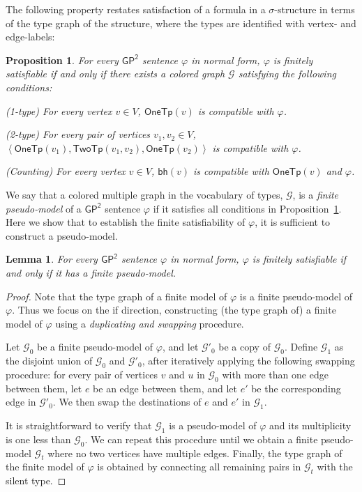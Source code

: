 \documentclass[10pt,a4paper]{article}
\newtheorem{lemma}[theorem]{Lemma}
\newtheorem{proposition}[theorem]{Proposition}
\theoremstyle{definition}
\theoremstyle{remark}
\newcommand{\cG}{\mathcal{G}}
\newcommand{\vocab}{\sigma}
\newcommand{\onetypeof}{\mathsf{OneTp}}
\newcommand{\twotypeof}{\mathsf{TwoTp}}
\newcommand{\GPtwo}   {\mathsf{GP^2}}
\newcommand{\tuple}[1]       {\left\langle #1 \right\rangle}
\newcommand{\bh}[1] {\mathsf{bh}\left( #1 \right)}
\begin{document}
The following property restates satisfaction of a formula in a $\vocab$-structure in terms of the type graph of the structure, where the types are identified with vertex- and edge-labels:
\begin{proposition}\label{prop:labeled_gptwo}
    For every $\GPtwo$ sentence $\varphi$ in normal form,
    $\varphi$ is finitely satisfiable if and only if
    there exists a colored graph $\cG$ satisfying the following conditions:
    \begin{compactitem}
        \item (1-type) For every vertex $v \in V$, $\onetypeof(v)$ is compatible with $\varphi$.
        \item (2-type) For every pair of vertices $v_1, v_2 \in V$,
        $\tuple{\onetypeof(v_1), \twotypeof(v_1, v_2), \onetypeof(v_2)}$ is compatible with $\varphi$.
        \item (Counting) For every vertex $v \in V$, $\bh{v}$ is compatible with $\onetypeof(v)$ and $\varphi$.
    \end{compactitem}
\end{proposition}

We say that a colored multiple graph in the vocabulary of types, $\cG$, is a \emph{finite pseudo-model} of a $\GPtwo$ sentence $\varphi$ if it satisfies all conditions in Proposition~\ref{prop:labeled_gptwo}.
Here we show that to establish the finite satisfiability of $\varphi$, it is sufficient to construct a pseudo-model.

\begin{lemma}\label{lem:pseudo}
    For every $\GPtwo$ sentence $\varphi$ in normal form,
    $\varphi$ is finitely satisfiable if and only if it has a finite pseudo-model.
\end{lemma}

\begin{proof}
    Note that the type graph of a finite model of $\varphi$ is a finite pseudo-model of $\varphi$. 
    Thus we focus on the if direction,  constructing (the type graph of) a finite model of $\varphi$ using a \emph{duplicating and swapping} procedure.
   
    Let $\cG_0$ be a finite pseudo-model of $\varphi$, and let $\cG'_0$ be a copy of $\cG_0$.
    Define $\cG_1$ as the disjoint union of $\cG_0$ and $\cG'_0$,
    after iteratively applying the following swapping procedure:
    for every pair of vertices $v$ and $u$ in $\cG_0$ with more than one edge between them,
    let $e$ be an edge between them, and let $e'$ be the corresponding edge in $\cG'_0$.
    We then swap the destinations of $e$ and $e'$ in $\cG_1$.

    It is straightforward to verify that $\cG_1$ is a pseudo-model of $\varphi$ and its multiplicity is one less than $\cG_0$.
    We can repeat this procedure until we obtain a finite pseudo-model $\cG_t$ where no two vertices have multiple edges.
    Finally, the type graph of the finite model  of $\varphi$ is obtained by connecting all remaining pairs in $\cG_t$ with the silent type.
\end{proof}
\end{document}

